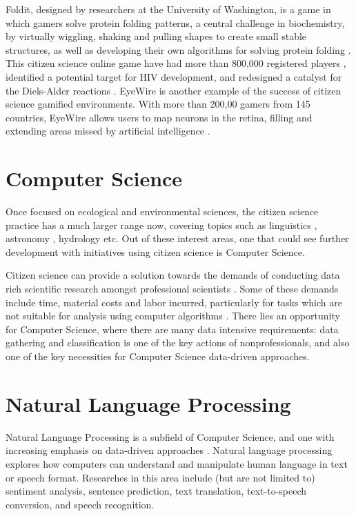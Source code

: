 Foldit, designed by researchers at the University of Washington, is a game in which gamers solve protein folding patterns, a central challenge in biochemistry, by virtually wiggling, shaking and pulling shapes to create small stable structures, as well as developing their own algorithms for solving protein folding \cite{bourzac2008enlisting}. This citizen science online game have had more than 800,000 registered players \cite{foldit2021players}, identified a potential target for HIV development, and redesigned a catalyst for the Diels-Alder reactions \cite{kreitmair2019citizen}. EyeWire is another example of the success of citizen science gamified environments. With more than 200,00 gamers from 145 countries, EyeWire allows users to map neurons in the retina, filling and extending areas missed by artificial intelligence \cite{kreitmair2019citizen}.

\section*{Computer Science}

Once focused on ecological and environmental sciences, the citizen science practice has a much larger range now, covering topics such as linguistics \cite{svendsen2018dynamics}, astronomy \cite{marshall2015ideas}, hydrology \cite{buytaert2014citizen} etc. Out of these interest areas, one that could see further development with initiatives using citizen science is Computer Science.

Citizen science can provide a solution towards the demands of conducting data rich scientific research amongst 
professional scientists \cite{greenhill2014playing}. Some of these demands include time, material costs and labor incurred, particularly for tasks which are not suitable for analysis using computer algorithms \cite{silvertown2009new}. There lies an opportunity for Computer Science, where there are many data intensive requirements: data gathering and classification is one of the key actions of nonprofessionals, and also one of the key necessities for Computer Science data-driven approaches.

\section*{Natural Language Processing}

Natural Language Processing is a subfield of Computer Science, and one with increasing emphasis on data-driven approaches \cite{moore2003comparison}. Natural language processing explores how computers can understand and manipulate human language in text or speech format. Researches in this area include (but are not limited to) sentiment analysis, sentence prediction, text translation, text-to-speech conversion, and speech recognition.


